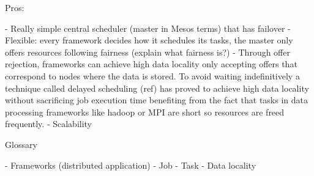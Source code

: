 Pros:

- Really simple central scheduler (master in Mesos terms) that has
  failover 
- Flexible: every framework decides how it schedules its tasks, the
master only offers resources following fairness (explain what fairness is?)
- Through offer rejection, frameworks can achieve high data locality
only accepting offers that correspond to nodes where the data is
stored. To avoid waiting indefinitively a technique called delayed
scheduling (ref) has proved to achieve high data locality without
sacrificing job execution time benefiting from the fact that tasks in
data processing frameworks like hadoop or MPI are short so resources
are freed frequently.
- Scalability



Glossary

- Frameworks (distributed application)
- Job
- Task
- Data locality
